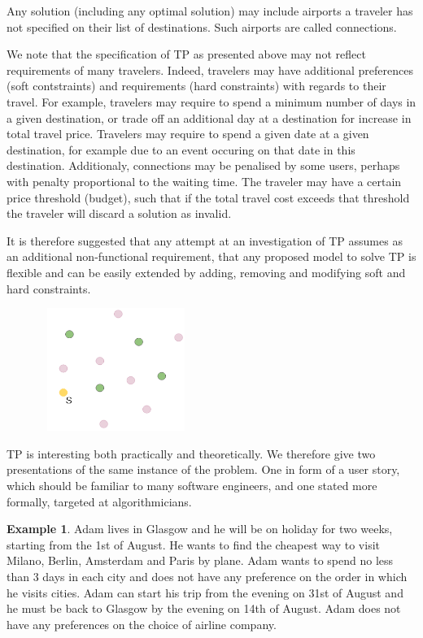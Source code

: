 \documentclass{article}
\theoremstyle{definition}
\newtheorem{example}{Example}
\begin{document}
Any solution (including any optimal solution) may include airports a traveler has not specified on their list of destinations. Such airports are called connections.

We note that the specification of TP as presented above may not reflect requirements of many travelers. Indeed, travelers may have additional preferences (soft contstraints) and requirements (hard constraints) with regards to their travel. For example, travelers may require to spend a minimum number of days in a given destination, or trade off an additional day at a destination for increase in total travel price. Travelers may require to spend a given date at a given destination, for example due to an event occuring on that date in this destination. Additionaly, connections may be penalised by some users, perhaps with penalty proportional to the waiting time. The traveler may have a certain price threshold (budget), such that if the total travel cost exceeds that threshold the traveler will discard a solution as invalid.

It is therefore suggested that any attempt at an investigation of TP assumes as an additional non-functional requirement, that any proposed model to solve TP is flexible and can be easily extended by adding, removing and modifying soft and hard constraints.

\begin{figure}[h]
\centering
\includegraphics[width=5cm, height=4cm]{destinations0.png}
\end{figure}

TP is interesting both practically and theoretically. We therefore give two presentations of the same instance of the problem. One in form of a user story, which should be familiar to many software engineers, and one stated more formally, targeted at algorithmicians.

\begin{example}
Adam lives in Glasgow and he will be on holiday for two weeks, starting from the 1st of August. He wants to find the cheapest way to visit Milano, Berlin, Amsterdam and Paris by plane. Adam wants to spend no less than 3 days in each city and does not have any preference on the order in which he visits cities. %
Adam can start his trip from the evening on 31st of August and he must be back to Glasgow by the evening on 14th of August. Adam does not have any preferences on the choice of airline company.
\end{example}
\end{document}
